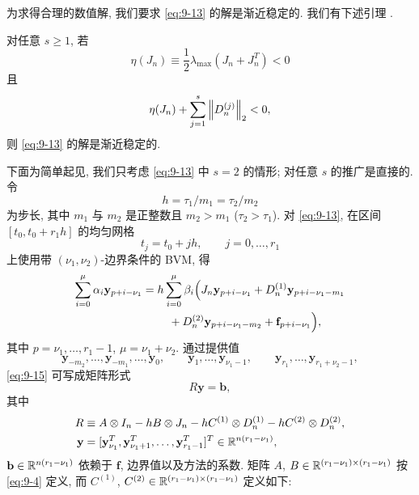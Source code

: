 为求得合理的数值解, 我们要求 \eqref{eq:9-13} 的解是渐近稳定的. 我们有下述引理 \cite{src:63,src:64,src:91}.

\begin{lemma}
\label{lem:9-2}
对任意 $s\geqslant1$, 若
\[
  \eta(J_n)\equiv\frac{1}{2}\lambda_{\max}(J_n+J_n^T)<0
\]
且
\begin{equation}
  \eta(J_n)+\sum_{j=1}^{s}\left\|D_n^{(j)}\right\|_2<0,
  \label{eq:9-14}
\end{equation}
则 \eqref{eq:9-13} 的解是渐近稳定的.
\end{lemma}

下面为简单起见, 我们只考虑 \eqref{eq:9-13} 中 $s=2$ 的情形; 对任意 $s$ 的推广是直接的. 令
\[
  h=\tau_1/m_1=\tau_2/m_2
\]
为步长, 其中 $m_1$ 与 $m_2$ 是正整数且 $m_2>m_1$ ($\tau_2>\tau_1$). 对 \eqref{eq:9-13}, 在区间 $[t_0,t_0+r_1h]$ 的均匀网格
\[
  t_j=t_0+jh,\qquad j=0,\ldots,r_1
\]
上使用带 $(\nu_1,\nu_2)$-边界条件的 BVM, 得
\begin{equation}
  \begin{aligned}
    \sum_{i=0}^{\mu}\alpha_i\mathbf{y}_{p+i-\nu_1}
    ={}&h\sum_{i=0}^{\mu}\beta_i\Bigl(J_n\mathbf{y}_{p+i-\nu_1}
      +D_n^{(1)}\mathbf{y}_{p+i-\nu_1-m_1}\\
    &\quad+D_n^{(2)}\mathbf{y}_{p+i-\nu_1-m_2}
      +\mathbf{f}_{p+i-\nu_1}\Bigr),
  \end{aligned}
  \label{eq:9-15}
\end{equation}
其中 $p=\nu_1,\ldots,r_1-1$, $\mu=\nu_1+\nu_2$. 通过提供值
\begin{equation}
  \mathbf{y}_{-m_2},\ldots,\mathbf{y}_{-m_1},\ldots,\mathbf{y}_0,\qquad
  \mathbf{y}_1,\ldots,\mathbf{y}_{\nu_1-1},\qquad
  \mathbf{y}_{r_1},\ldots,\mathbf{y}_{r_1+\nu_2-1},
  \label{eq:9-16}
\end{equation}
\eqref{eq:9-15} 可写成矩阵形式
\[
  R\mathbf{y}=\mathbf{b},
\]
其中
\begin{equation}
  \begin{aligned}
    R&\equiv A\otimes I_n-hB\otimes J_n-hC^{(1)}\otimes D_n^{(1)}
      -hC^{(2)}\otimes D_n^{(2)},\\
    \mathbf{y}&=[\mathbf{y}_{\nu_1}^T,\mathbf{y}_{\nu_1+1}^T,\ldots,
      \mathbf{y}_{r_1-1}^T]^T\in\mathbb{R}^{n(r_1-\nu_1)},
  \end{aligned}
  \label{eq:9-17}
\end{equation}
$\mathbf{b}\in\mathbb{R}^{n(r_1-\nu_1)}$ 依赖于 $\mathbf{f}$, 边界值以及方法的系数. 矩阵 $A$, $B\in\mathbb{R}^{(r_1-\nu_1)\times(r_1-\nu_1)}$ 按 \eqref{eq:9-4} 定义, 而 $C^{(1)}$, $C^{(2)}\in\mathbb{R}^{(r_1-\nu_1)\times(r_1-\nu_1)}$ 定义如下:
